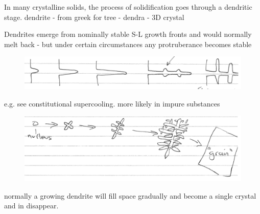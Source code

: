 \documentclass[class=report, crop=false, 12pt,a4paper]{standalone}
\begin{document}
In many crystalline solids, the process of solidification goes through a dendritic stage. dendrite - from greek for tree - dendra - 3D crystal
\begin{figure}[h]
  \centering
  \hfill
\end{figure}
Dendrites emerge from nominally stable S-L growth fronts and would normally melt back - but under certain circumstances any protruberance becomes stable
\begin{figure}
  \centering
  \includegraphics[width = \textwidth]{../img/dendriticgrowth2}
\end{figure}
e.g. see constitutional supercooling. more likely in impure substances
\begin{figure}[h!]
  \centering
  \includegraphics[width = \textwidth]{../img/dendriticgrowth}
\end{figure}
normally a growing dendrite will fill space gradually and become a single crystal and in disappear. 
\end{document}
